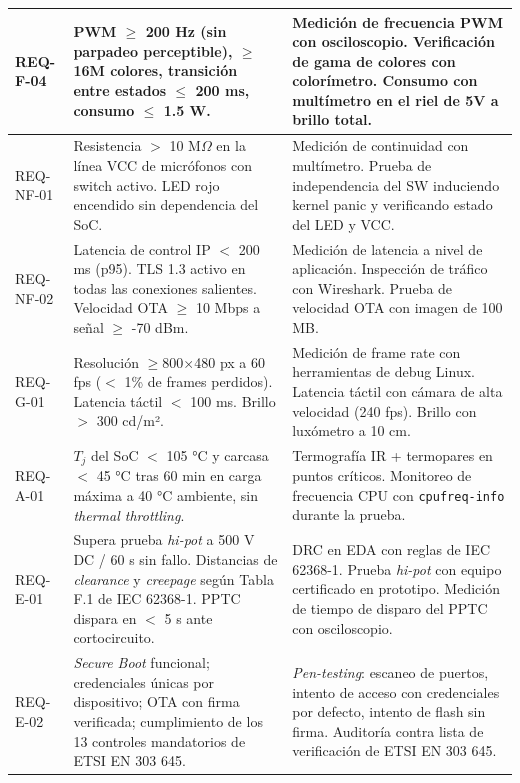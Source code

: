 \documentclass[%
	paper=a4,
	twoside=false,
	parskip=half,
	chapterprefix=false,
	10pt,
	headings=normal,
	bibliography=totoc,
	listof=totoc,
	titlepage=on,
	captions=tableabove,
	draft=false, 
]{scrbook}%
\begin{document}
\begin{longtable}{|>{\raggedright\arraybackslash}p{1.6cm}|
                   >{\raggedright\arraybackslash}p{6.2cm}|
                   >{\raggedright\arraybackslash}p{6.2cm}|}
REQ-F-04 &
PWM $\geq$ 200 Hz (sin parpadeo perceptible), $\geq$16M colores, transición entre estados $\leq$ 200 ms, consumo $\leq$ 1.5 W. &
Medición de frecuencia PWM con osciloscopio. Verificación de gama de colores con colorímetro. Consumo con multímetro en el riel de 5V a brillo total. \\ \hline

REQ-NF-01 &
Resistencia $>$ 10 M$\Omega$ en la línea VCC de micrófonos con switch activo. LED rojo encendido sin dependencia del SoC. &
Medición de continuidad con multímetro. Prueba de independencia del SW induciendo kernel panic y verificando estado del LED y VCC. \\ \hline

REQ-NF-02 &
Latencia de control IP $<$ 200 ms (p95). TLS 1.3 activo en todas las conexiones salientes. Velocidad OTA $\geq$ 10 Mbps a señal $\geq$ -70 dBm. &
Medición de latencia a nivel de aplicación. Inspección de tráfico con Wireshark. Prueba de velocidad OTA con imagen de 100 MB. \\ \hline

REQ-G-01 &
Resolución $\geq$800$\times$480 px a 60 fps ($<$ 1\% de frames perdidos). Latencia táctil $<$ 100 ms. Brillo $>$ 300 cd/m². &
Medición de frame rate con herramientas de debug Linux. Latencia táctil con cámara de alta velocidad (240 fps). Brillo con luxómetro a 10 cm. \\ \hline

REQ-A-01 &
$T_j$ del SoC $<$ 105 °C y carcasa $<$ 45 °C tras 60 min en carga máxima a 40 °C ambiente, sin \textit{thermal throttling}. &
Termografía IR + termopares en puntos críticos. Monitoreo de frecuencia CPU con \texttt{cpufreq-info} durante la prueba. \\ \hline

REQ-E-01 &
Supera prueba \textit{hi-pot} a 500 V DC / 60 s sin fallo. Distancias de \textit{clearance} y \textit{creepage} según Tabla F.1 de IEC 62368-1. PPTC dispara en $<$ 5 s ante cortocircuito. &
DRC en EDA con reglas de IEC 62368-1. Prueba \textit{hi-pot} con equipo certificado en prototipo. Medición de tiempo de disparo del PPTC con osciloscopio. \\ \hline

REQ-E-02 &
\textit{Secure Boot} funcional; credenciales únicas por dispositivo; OTA con firma verificada; cumplimiento de los 13 controles mandatorios de ETSI EN 303 645. &
\textit{Pen-testing}: escaneo de puertos, intento de acceso con credenciales por defecto, intento de flash sin firma. Auditoría contra lista de verificación de ETSI EN 303 645. \\ \hline

\end{longtable}
\endgroup
\end{document}
